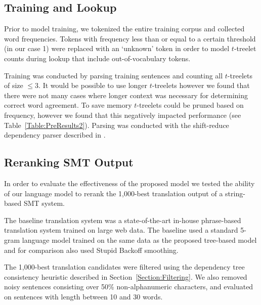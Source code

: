 \documentclass[english]{jnlp_1.4}
\begin{document}
\subsection{Training and Lookup}

Prior to model training, we tokenized the entire training corpus and collected
word frequencies. Tokens with frequency less than or equal to a certain threshold
(in our case 1) were replaced with an `unknown' token in order to model $t$-treelet
counts during lookup that include out-of-vocabulary tokens.

Training was conducted by parsing training sentences and counting all $t$-treelets
of size $\le 3$. It would be possible to use longer $t$-treelets however we found that
there were not many cases where longer context was necessary for determining correct
word agreement. To save memory $t$-treelets could be pruned based on frequency, however
we found that this negatively impacted performance (see Table~\ref{Table:PreResults2}).
Parsing was conducted with the shift-reduce dependency parser described in \cite{Lerner13}.

\begin{table}[t]
\label{Table:PreResults2}

\end{table}


\subsection{Reranking SMT Output}
\label{Section:Reranking}

In order to evaluate the effectiveness of the proposed model
we tested the ability of our language model to rerank the
1,000-best translation output of a string-based SMT system.

The baseline translation system was a state-of-the-art in-house phrase-based
translation system trained on large web data. The baseline
used a standard 5-gram language model trained on the same data as the
proposed tree-based model and for comparison also used Stupid Backoff smoothing.

The 1,000-best translation candidates were filtered using the dependency tree consistency
heuristic described in Section~\ref{Section:Filtering}. We also removed noisy
sentences consisting over 50\% non-alphanumeric characters, and evaluated on
sentences with length between 10 and 30 words.
\end{document}
